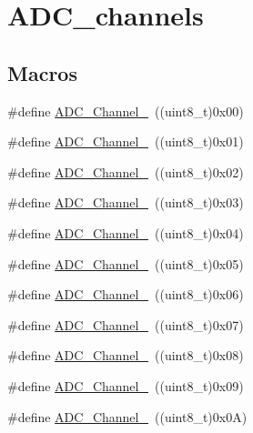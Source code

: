 \hypertarget{group___a_d_c__channels}{}\section{A\+D\+C\+\_\+channels}
\label{group___a_d_c__channels}
\subsection*{Macros}
\begin{DoxyCompactItemize}
\item 
\#define \mbox{\hyperlink{group___a_d_c__channels_ga40ec353803e9470a5721ef5bf0b1ab24}{A\+D\+C\+\_\+\+Channel\+\_}}~((uint8\+\_\+t)0x00)
\item 
\#define \mbox{\hyperlink{group___a_d_c__channels_ga0b04cebf8d62085eca6dc7daa3d5d3f0}{A\+D\+C\+\_\+\+Channel\+\_}}~((uint8\+\_\+t)0x01)
\item 
\#define \mbox{\hyperlink{group___a_d_c__channels_gabc66e2529583e11b591efd2df7070571}{A\+D\+C\+\_\+\+Channel\+\_}}~((uint8\+\_\+t)0x02)
\item 
\#define \mbox{\hyperlink{group___a_d_c__channels_ga9f93cbacd030f1c79f96f8889b0cdee6}{A\+D\+C\+\_\+\+Channel\+\_}}~((uint8\+\_\+t)0x03)
\item 
\#define \mbox{\hyperlink{group___a_d_c__channels_gafc7218417f729659dd8f06185cc2eafa}{A\+D\+C\+\_\+\+Channel\+\_}}~((uint8\+\_\+t)0x04)
\item 
\#define \mbox{\hyperlink{group___a_d_c__channels_ga42822abae41faabde2a2da877e0cc854}{A\+D\+C\+\_\+\+Channel\+\_}}~((uint8\+\_\+t)0x05)
\item 
\#define \mbox{\hyperlink{group___a_d_c__channels_ga7e24a73eec4aeb7d8e2f9008825ceacb}{A\+D\+C\+\_\+\+Channel\+\_}}~((uint8\+\_\+t)0x06)
\item 
\#define \mbox{\hyperlink{group___a_d_c__channels_ga9723aa5fe6b9f4af1ffd3b90e6eef8d1}{A\+D\+C\+\_\+\+Channel\+\_}}~((uint8\+\_\+t)0x07)
\item 
\#define \mbox{\hyperlink{group___a_d_c__channels_ga99b2c662d4068152e0e80a048036cc48}{A\+D\+C\+\_\+\+Channel\+\_}}~((uint8\+\_\+t)0x08)
\item 
\#define \mbox{\hyperlink{group___a_d_c__channels_ga01a61c428be0cb69327e428e32a42aa1}{A\+D\+C\+\_\+\+Channel\+\_}}~((uint8\+\_\+t)0x09)
\item 
\#define \mbox{\hyperlink{group___a_d_c__channels_gabfa98b580f49a82a83dcb1df32efceca}{A\+D\+C\+\_\+\+Channel\+\_}}~((uint8\+\_\+t)0x0\+A)
\item 

\end{DoxyCompactItemize}
